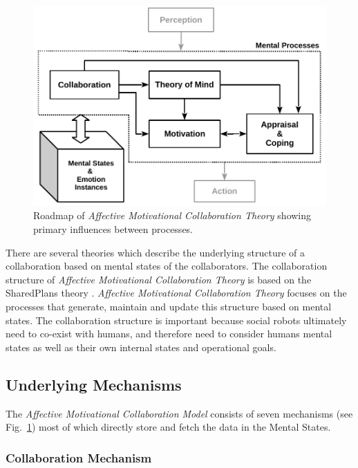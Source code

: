 \begin{figure}[h!]
  \includegraphics[scale=0.78]{figure/theory-general-croped.pdf}
  \caption{Roadmap of \textit{Affective Motivational Collaboration Theory}
  showing primary influences between processes.}
  \label{fig:theory}
\end{figure}

There are several theories which describe the underlying structure of a
collaboration based on mental states of the collaborators. The collaboration
structure of \textit{Affective Motivational Collaboration Theory} is based on
the SharedPlans theory \cite{grosz:shared-plans}. \textit{Affective Motivational
Collaboration Theory} focuses on the processes that generate, maintain and
update this structure based on mental states. The collaboration structure is
important because social robots ultimately need to co-exist with humans, and
therefore need to consider humans mental states as well as their own internal
states and operational goals.

\subsection{Underlying Mechanisms}
\label{sec:mechanisms}

The \textit{Affective Motivational Collaboration Model} consists of seven
mechanisms (see Fig.~\ref{fig:theory}) most of which directly store and
fetch the data in the Mental States.

\subsubsection{Collaboration Mechanism}

